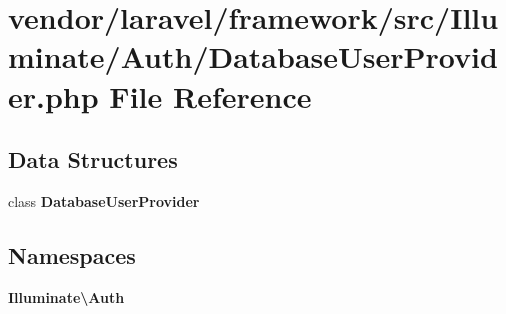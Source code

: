 \section{vendor/laravel/framework/src/\+Illuminate/\+Auth/\+Database\+User\+Provider.php File Reference}
\label{_database_user_provider_8php}
\subsection*{Data Structures}
\begin{DoxyCompactItemize}
\item 
class {\bf Database\+User\+Provider}
\end{DoxyCompactItemize}
\subsection*{Namespaces}
\begin{DoxyCompactItemize}
\item 
 {\bf Illuminate\textbackslash{}\+Auth}
\end{DoxyCompactItemize}
